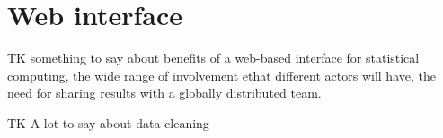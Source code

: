 \section{Web interface}

TK something to say about benefits of a web-based interface for
statistical computing, the wide range of involvement ethat different
actors will have, the need for sharing results with a globally
distributed team.

TK A lot to say about data cleaning
